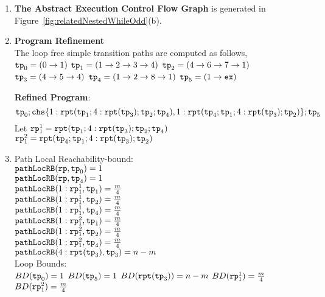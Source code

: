   \begin{enumerate}
    \item  \textbf{The Abstract Execution Control Flow Graph} is generated in Figure~\ref{fig:relatedNestedWhileOdd}(b).
    \item \textbf{Program Refinement}
    \\
    The loop free simple transition paths are computed as follows,
    \\ 
    $\mathtt{tp}_0 = (0 \to 1)$
      \quad
      $\mathtt{tp}_1 = (1 \to 2 \to 3 \to 4)$
      \quad
      $\mathtt{tp}_2 = (4 \to 6 \to 7 \to 1)$
      \quad
      $\mathtt{tp}_3 = (4 \to 5 \to 4)$
      \quad
      $\mathtt{tp}_4 = (1 \to 2 \to 8 \to 1)$
      \quad
      $\mathtt{tp}_5 = (1 \to \mathtt{ex})$

  \textbf{Refined Program}:
    \[
    \tpath_0 ; \rpchoose{ 1: \rprepeat(\tpath_1; 4:\rprepeat(\tpath_3); \tpath_2; \tpath_4), 
    1: \rprepeat(\tpath_4; \tpath_1; 4:\rprepeat(\tpath_3); \tpath_2) }; \tpath_5
    \]
    Let $\mathtt{rp}_1^1 = \mathtt{rpt}(\mathtt{tp}_1; 4:\mathtt{rpt}(\mathtt{tp}_3); \mathtt{tp}_2; \mathtt{tp}_4)$
    \\
    $\mathtt{rp}_1^2 = \mathtt{rpt}(\mathtt{tp}_4; \mathtt{tp}_1; 4:\mathtt{rpt}(\mathtt{tp}_3); \mathtt{tp}_2) $
    \item {Path Local Reachability-bound}:
    \\
    $\mathtt{pathLocRB}(\mathtt{rp}, \mathtt{tp}_0) = 1$ \\
    $\mathtt{pathLocRB}(\mathtt{rp}, \mathtt{tp}_4) = 1$ \\
    $\mathtt{pathLocRB}(1: \mathtt{rp}_1^1, \mathtt{tp}_1) = \frac{m}{4}$ \\
    $\mathtt{pathLocRB}(1: \mathtt{rp}_1^1, \mathtt{tp}_2) = \frac{m}{4}$ \\
    $\mathtt{pathLocRB}(1: \mathtt{rp}_1^1, \mathtt{tp}_4) = \frac{m}{4}$ \\
    $\mathtt{pathLocRB}(1: \mathtt{rp}_1^2, \mathtt{tp}_1) = \frac{m}{4}$ \\
    $\mathtt{pathLocRB}(1: \mathtt{rp}_1^2, \mathtt{tp}_2) = \frac{m}{4}$ \\
    $\mathtt{pathLocRB}(1: \mathtt{rp}_1^2, \mathtt{tp}_4) = \frac{m}{4}$ \\
    $\mathtt{pathLocRB}(4: \mathtt{rpt}(\mathtt{tp}_3), \mathtt{tp}_3) = n - m$ 
    \\
    Loop Bounds:
    \\
    $BD(\mathtt{tp}_0) = 1$
    \quad
    $BD(\mathtt{tp}_5) = 1$
    \quad
    $BD(\mathtt{rpt}(\mathtt{tp}_3)) = n - m $
    \quad
    $BD(\mathtt{rp}_1^1) = \frac{m}{4} $
    \quad
    $BD(\mathtt{rp}_1^2) = \frac{m}{4} $


\end{enumerate}

